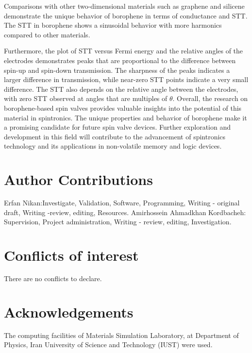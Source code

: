 \documentclass[twoside,twocolumn,9pt]{article}
\renewcommand{\refname}{Notes and references}
\begin{document}
Comparisons with other two-dimensional materials such as graphene and silicene demonstrate the unique behavior of borophene in terms of conductance and STT. The STT in borophene shows a sinusoidal behavior with more harmonics compared to other materials.

Furthermore, the plot of STT versus Fermi energy and the relative angles of the electrodes demonstrates peaks that are proportional to the difference between spin-up and spin-down transmission. The sharpness of the peaks indicates a larger difference in transmission, while near-zero STT points indicate a very small difference. The STT also depends on the relative angle between the electrodes, with zero STT observed at angles that are multiples of $\theta$. Overall, the research on borophene-based spin valves provides valuable insights into the potential of this material in spintronics. The unique properties and behavior of borophene make it a promising candidate for future spin valve devices. Further exploration and development in this field will contribute to the advancement of spintronics technology and its applications in non-volatile memory and logic devices.

\section*{Author Contributions}
Erfan Nikan:Investigate, Validation, Software, Programming, Writing - original draft, Writing -review, editing, Resources.
Amirhossein Ahmadkhan Kordbacheh: Supervision, Project administration, Writing - review, editing, Investigation.
\section*{Conflicts of interest}
There are no conflicts to declare.
\section*{Acknowledgements}
The computing facilities of Materials Simulation Laboratory, at Department of Physics, Iran University of Science and Technology (IUST) were used.


\balance


\end{document}
